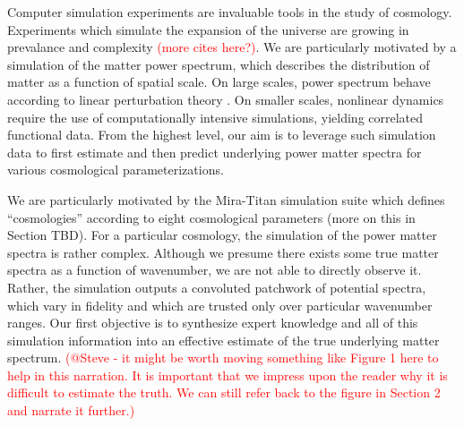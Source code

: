 \documentclass[11pt]{article}
\begin{document}
Computer simulation experiments are invaluable tools in the study of cosmology.
Experiments which simulate the expansion of the universe are growing
in prevalance and complexity \citep[e.g.,][]{lawrence2010coyote,moran2023mira}
\textcolor{red}{(more cites here?)}.  
We are particularly motivated by a simulation
of the matter power spectrum, which describes the distribution of matter as a 
function of spatial scale. 
On large scales, power spectrum behave according to linear perturbation 
theory \citep{pietroni2008flowing, lesgourgues2009non}.  On smaller scales, nonlinear 
dynamics require the use of computationally intensive simulations, yielding
correlated functional data.
From the highest level, our aim is to leverage such simulation data to 
first estimate and then predict underlying power matter spectra for various 
cosmological parameterizations.


We are particularly motivated by the Mira-Titan simulation suite \citep{moran2023mira}
which defines ``cosmologies'' according to eight cosmological parameters (more on this
in Section TBD).  For a particular cosmology, the simulation of the power matter spectra 
is rather complex.  Although we presume there exists some true matter spectra as a function
of wavenumber, we are not able to directly observe it.  Rather, the simulation outputs 
a convoluted patchwork of potential spectra, which vary in fidelity and which are trusted
only over particular wavenumber ranges.  Our first objective is to synthesize expert knowledge
and all of this simulation information into an effective estimate of the true underlying
matter spectrum.
\textcolor{red}{(@Steve - it might be worth moving something like Figure 1
here to help in this narration.  It is important that we impress upon the reader why
it is difficult to estimate the truth.  We can still refer back to the figure in 
Section 2 and narrate it further.)}  
\end{document}
